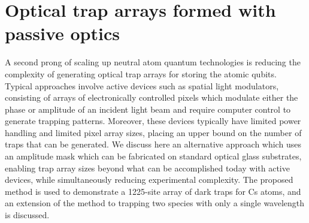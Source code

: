 \section{Optical trap arrays formed with passive optics}
A second prong of scaling up neutral atom quantum technologies is reducing the complexity of generating optical trap arrays for storing the atomic qubits. Typical approaches involve active devices such as spatial light modulators, consisting of arrays of electronically controlled pixels which modulate either the phase or amplitude of an incident light beam and require computer control to generate trapping patterns. Moreover, these devices typically have limited power handling and limited pixel array sizes, placing an upper bound on the number of traps that can be generated. We discuss here an alternative approach which uses an amplitude mask which can be fabricated on standard optical glass substrates, enabling trap array sizes beyond what can be accomplished today with active devices, while simultaneously reducing experimental complexity. The proposed method is used to demonstrate a 1225-site array of dark traps for Cs atoms, and an extension of the method to trapping two species with only a single wavelength is discussed.